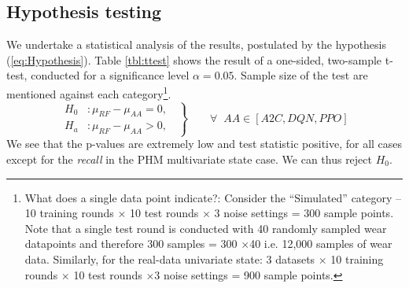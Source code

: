 \documentclass[a4paper, 12pt]{article}
\begin{document}
%			


\subsection{Hypothesis testing}
We undertake a statistical analysis of the results, postulated by the hypothesis (\ref{eq:Hypothesis}). Table \ref{tbl:ttest} shows the result of a one-sided, two-sample t-test, conducted for a significance level $\alpha=0.05$. Sample size of the test are mentioned against each category\footnote{What does a single data point indicate?: Consider the ``Simulated'' category -- 10 training rounds $\times$ 10 test rounds $\times$ 3 noise settings = 300 sample points. Note that a single test round is conducted with 40 randomly sampled wear datapoints and therefore 300 samples = 300 $\times$40 i.e. 12,000 samples of wear data. Similarly, for the real-data univariate state: 3 datasets $\times$ 10 training rounds $\times$ 10 test rounds $\times$3 noise settings = 900 sample points.}.
\begin{equation}
	\left.\begin{aligned}
		H_0 & : \mu_{RF} - \mu_{AA} = 0,\;\; \\
		H_a & : \mu_{RF} - \mu_{AA} > 0, \;\;
	\end{aligned}
	\right\}
	\qquad \forall \;\; \text{$AA \in[A2C, DQN, PPO]$}
	\label{eq:Hypothesis}
\end{equation}
We see that the p-values are extremely low and test statistic positive, for all cases except for the \textit{recall} in the PHM multivariate state case. We can thus reject $H_0$.
\end{document}
